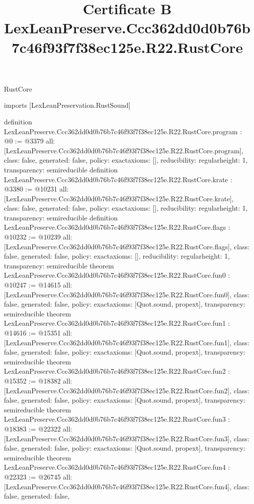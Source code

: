 \begin{lexlean}{RustCore}
\title{Certificate B LexLeanPreserve.Ccc362dd0d0b76b7c46f93f7f38ec125e.R22.RustCore}
\begin{coremodule}
imports [LexLeanPreservation.RustSound]

definition LexLeanPreserve.Ccc362dd0d0b76b7c46f93f7f38ec125e.R22.RustCore.program : @0 := @3379 {
  all: [LexLeanPreserve.Ccc362dd0d0b76b7c46f93f7f38ec125e.R22.RustCore.program],
  class: false,
  generated: false,
  policy: exact{axioms: []},
  reducibility: regular{height: 1},
  transparency: semireducible
}
definition LexLeanPreserve.Ccc362dd0d0b76b7c46f93f7f38ec125e.R22.RustCore.krate : @3380 := @10231 {
  all: [LexLeanPreserve.Ccc362dd0d0b76b7c46f93f7f38ec125e.R22.RustCore.krate],
  class: false,
  generated: false,
  policy: exact{axioms: []},
  reducibility: regular{height: 1},
  transparency: semireducible
}
definition LexLeanPreserve.Ccc362dd0d0b76b7c46f93f7f38ec125e.R22.RustCore.flags : @10232 := @10239 {
  all: [LexLeanPreserve.Ccc362dd0d0b76b7c46f93f7f38ec125e.R22.RustCore.flags],
  class: false,
  generated: false,
  policy: exact{axioms: []},
  reducibility: regular{height: 1},
  transparency: semireducible
}
theorem LexLeanPreserve.Ccc362dd0d0b76b7c46f93f7f38ec125e.R22.RustCore.fun0 : @10247 := @14615 {
  all: [LexLeanPreserve.Ccc362dd0d0b76b7c46f93f7f38ec125e.R22.RustCore.fun0],
  class: false,
  generated: false,
  policy: exact{axioms: [Quot.sound, propext]},
  transparency: semireducible
}
theorem LexLeanPreserve.Ccc362dd0d0b76b7c46f93f7f38ec125e.R22.RustCore.fun1 : @14616 := @15351 {
  all: [LexLeanPreserve.Ccc362dd0d0b76b7c46f93f7f38ec125e.R22.RustCore.fun1],
  class: false,
  generated: false,
  policy: exact{axioms: [Quot.sound, propext]},
  transparency: semireducible
}
theorem LexLeanPreserve.Ccc362dd0d0b76b7c46f93f7f38ec125e.R22.RustCore.fun2 : @15352 := @18382 {
  all: [LexLeanPreserve.Ccc362dd0d0b76b7c46f93f7f38ec125e.R22.RustCore.fun2],
  class: false,
  generated: false,
  policy: exact{axioms: [Quot.sound, propext]},
  transparency: semireducible
}
theorem LexLeanPreserve.Ccc362dd0d0b76b7c46f93f7f38ec125e.R22.RustCore.fun3 : @18383 := @22322 {
  all: [LexLeanPreserve.Ccc362dd0d0b76b7c46f93f7f38ec125e.R22.RustCore.fun3],
  class: false,
  generated: false,
  policy: exact{axioms: [Quot.sound, propext]},
  transparency: semireducible
}
theorem LexLeanPreserve.Ccc362dd0d0b76b7c46f93f7f38ec125e.R22.RustCore.fun4 : @22323 := @26745 {
  all: [LexLeanPreserve.Ccc362dd0d0b76b7c46f93f7f38ec125e.R22.RustCore.fun4],
  class: false,
  generated: false,
}
\end{coremodule}
\end{lexlean}
